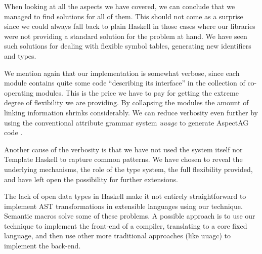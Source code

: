 When looking at all the aspects we have covered, 
we can conclude that we managed to find solutions for all of them. 
This should not come as a surprise since we could always fall back to plain Haskell in those cases where 
our libraries were not providing a standard solution for the problem at hand. 
We have seen such solutions for dealing with flexible symbol tables, generating new identifiers and types.

We mention again that our implementation is somewhat verbose, since each module contains quite some code ``describing its interface'' in the collection of co-operating modules. 
This is the price we have to pay for getting the extreme degree of flexibility we are providing. 
By collapsing the modules the amount of linking information shrinks considerably.
We can reduce verbosity even further by using the conventional attribute grammar system \emph{uuagc} to generate AspectAG code \cite{VSM12}.

Another cause of the verbosity is that we have not used the system itself nor Template Haskell to capture common patterns. 
We have chosen to reveal the underlying mechanisms, the role of the type system, the full flexibility provided, 
and have left open the possibility for further extensions.

The lack of open data types in Haskell make it not entirely straightforward to implement AST transformations in extensible languages using our technique.
Semantic macros solve some of these problems. A possible approach is to use our technique to implement the front-end of a compiler,
translating to a core fixed language, and then use other more traditional approaches (like uuagc) to implement the back-end.

